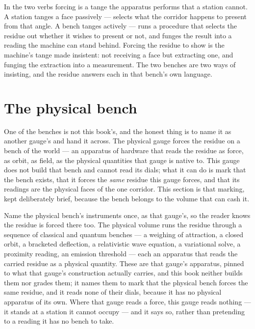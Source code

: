In the two verbs forcing is a tange the apparatus performs that a station cannot. A station tanges a face passively ---
selects what the corridor happens to present from that angle. A bench tanges actively --- runs a procedure that selects
the residue out whether it wishes to present or not, and funges the result into a reading the machine can stand behind.
Forcing the residue to show is the machine's tange made insistent: not receiving a face but extracting one, and funging
the extraction into a measurement. The two benches are two ways of insisting, and the residue answers each in that
bench's own language.

\section{The physical bench}

One of the benches is not this book's, and the honest thing is to name it as another gauge's and hand it across. The
physical gauge forces the residue on a bench of the world --- an apparatus of hardware that reads the residue as force,
as orbit, as field, as the physical quantities that gauge is native to. This gauge does not build that bench and cannot
read its dials; what it can do is mark that the bench exists, that it forces the \emph{same} residue this gauge forces,
and that its readings are the physical faces of the one corridor. This section is that marking, kept deliberately brief,
because the bench belongs to the volume that can cash it.

Name the physical bench's instruments once, as that gauge's, so the reader knows the residue is forced there too. The
physical volume runs the residue through a sequence of classical and quantum benches --- a weighing of attraction, a
closed orbit, a bracketed deflection, a relativistic wave equation, a variational solve, a proximity reading, an
emission threshold --- each an apparatus that reads the carried residue as a physical quantity. These are that gauge's
apparatus, pinned to what that gauge's construction actually carries, and this book neither builds them nor grades them;
it names them to mark that the physical bench forces the same residue, and it reads none of their dials, because it has
no physical apparatus of its own. Where that gauge reads a force, this gauge reads nothing --- it stands at a station it
cannot occupy --- and it says so, rather than pretending to a reading it has no bench to take.

